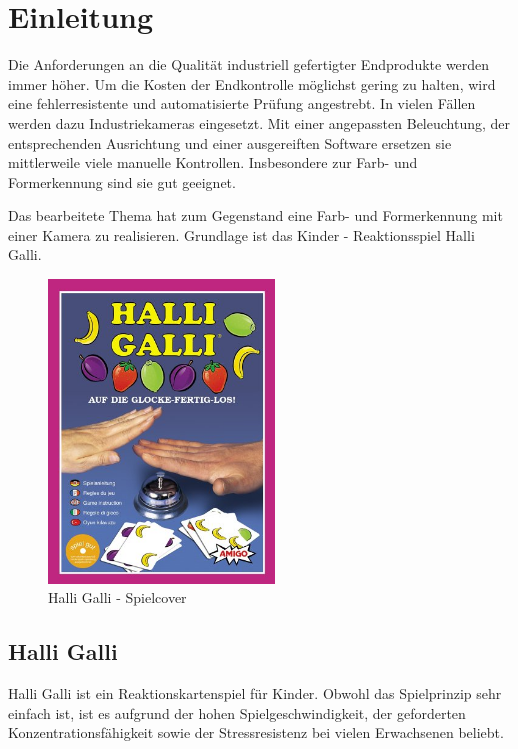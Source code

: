 
\section{Einleitung}
\label{sec:Einleitung}

Die Anforderungen an die Qualität industriell gefertigter Endprodukte werden immer höher. Um die Kosten der Endkontrolle möglichst gering zu halten, wird eine fehlerresistente und automatisierte Prüfung angestrebt. In vielen Fällen werden dazu Industriekameras eingesetzt. Mit einer angepassten Beleuchtung, der entsprechenden Ausrichtung und einer ausgereiften Software ersetzen sie mittlerweile viele manuelle Kontrollen. Insbesondere zur Farb- und Formerkennung sind sie gut geeignet.

Das bearbeitete Thema hat zum Gegenstand eine Farb- und Formerkennung mit einer Kamera zu realisieren. Grundlage ist das Kinder - Reaktionsspiel Halli Galli. 

\begin{figure}[H]
    \centering
    \includegraphics[width=6cm]{Abbildungen/cover}
    \caption[Cocer]{Halli Galli - Spielcover}
    \label{fig:Cover}
\end{figure}

\subsection{Halli Galli}

Halli Galli ist ein Reaktionskartenspiel für Kinder. Obwohl das Spielprinzip sehr einfach ist, ist es aufgrund der hohen Spielgeschwindigkeit, der geforderten Konzentrationsfähigkeit sowie der Stressresistenz bei vielen Erwachsenen beliebt. 

